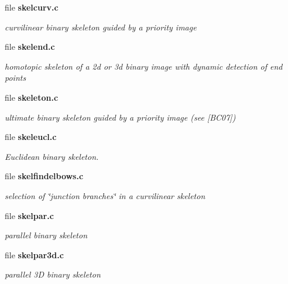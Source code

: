 \begin{CompactItemize}
\item 
file {\bf skelcurv.c}
\begin{CompactList}\small\item\em curvilinear binary skeleton guided by a priority image \item\end{CompactList}

\item 
file {\bf skelend.c}
\begin{CompactList}\small\item\em homotopic skeleton of a 2d or 3d binary image with dynamic detection of end points \item\end{CompactList}

\item 
file {\bf skeleton.c}
\begin{CompactList}\small\item\em ultimate binary skeleton guided by a priority image (see [BC07]) \item\end{CompactList}

\item 
file {\bf skeleucl.c}
\begin{CompactList}\small\item\em Euclidean binary skeleton. \item\end{CompactList}

\item 
file {\bf skelfindelbows.c}
\begin{CompactList}\small\item\em selection of \char`\"{}junction branches\char`\"{} in a curvilinear skeleton \item\end{CompactList}

\item 
file {\bf skelpar.c}
\begin{CompactList}\small\item\em parallel binary skeleton \item\end{CompactList}

\item 
file {\bf skelpar3d.c}
\begin{CompactList}\small\item\em parallel 3D binary skeleton \item\end{CompactList}


\end{CompactItemize}

